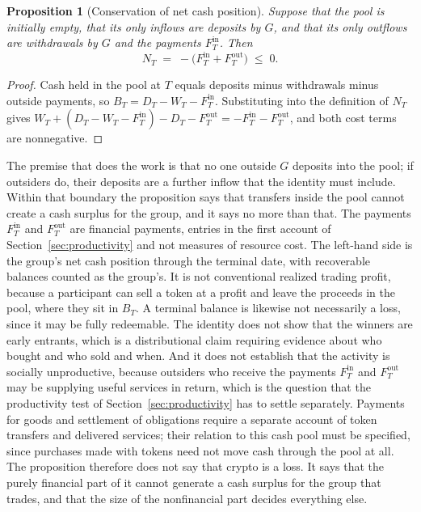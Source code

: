 \documentclass[11pt]{article}
\newtheorem{proposition}{Proposition}
\theoremstyle{remark}
\begin{document}
\begin{proposition}[Conservation of net cash position]\label{prop:conservation}
Suppose that the pool is initially empty, that its only inflows are deposits by $G$, and that its only outflows are withdrawals by $G$ and the payments $F^{\mathrm{in}}_T$. Then
\[
N_T\;=\;-\bigl(F^{\mathrm{in}}_T+F^{\mathrm{out}}_T\bigr)\;\le\;0 .
\]
\end{proposition}

\begin{proof}
Cash held in the pool at $T$ equals deposits minus withdrawals minus outside payments, so $B_T=D_T-W_T-F^{\mathrm{in}}_T$. Substituting into the definition of $N_T$ gives $W_T+(D_T-W_T-F^{\mathrm{in}}_T)-D_T-F^{\mathrm{out}}_T=-F^{\mathrm{in}}_T-F^{\mathrm{out}}_T$, and both cost terms are nonnegative.
\end{proof}

The premise that does the work is that no one outside $G$ deposits into the pool; if outsiders do, their deposits are a further inflow that the identity must include. Within that boundary the proposition says that transfers inside the pool cannot create a cash surplus for the group, and it says no more than that. The payments $F^{\mathrm{in}}_T$ and $F^{\mathrm{out}}_T$ are financial payments, entries in the first account of Section~\ref{sec:productivity} and not measures of resource cost. The left-hand side is the group's net cash position through the terminal date, with recoverable balances counted as the group's. It is not conventional realized trading profit, because a participant can sell a token at a profit and leave the proceeds in the pool, where they sit in $B_T$. A terminal balance is likewise not necessarily a loss, since it may be fully redeemable. The identity does not show that the winners are early entrants, which is a distributional claim requiring evidence about who bought and who sold and when. And it does not establish that the activity is socially unproductive, because outsiders who receive the payments $F^{\mathrm{in}}_T$ and $F^{\mathrm{out}}_T$ may be supplying useful services in return, which is the question that the productivity test of Section~\ref{sec:productivity} has to settle separately. Payments for goods and settlement of obligations require a separate account of token transfers and delivered services; their relation to this cash pool must be specified, since purchases made with tokens need not move cash through the pool at all. The proposition therefore does not say that crypto is a loss. It says that the purely financial part of it cannot generate a cash surplus for the group that trades, and that the size of the nonfinancial part decides everything else.
\end{document}
